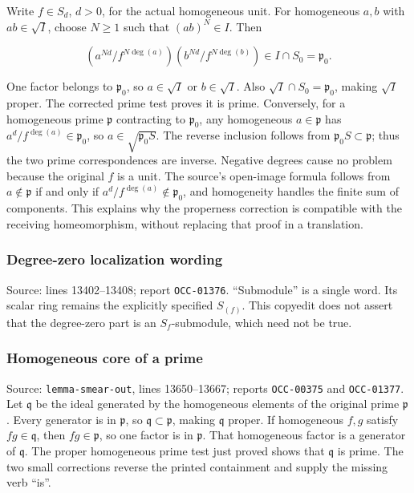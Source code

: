 Write \(f\in S_d\), \(d>0\), for the actual homogeneous unit. For homogeneous \(a,b\) with \(ab\in\sqrt I\), choose \(N\geq1\) such that \((ab)^N\in I\). Then

\[
\left(a^{Nd}/f^{N\deg(a)}\right)
\left(b^{Nd}/f^{N\deg(b)}\right)\in I\cap S_0=\mathfrak p_0.
\]

One factor belongs to \(\mathfrak p_0\), so \(a\in\sqrt I\) or \(b\in\sqrt I\). Also \(\sqrt I\cap S_0=\mathfrak p_0\), making \(\sqrt I\) proper. The corrected prime test proves it is prime. Conversely, for a homogeneous prime \(\mathfrak p\) contracting to \(\mathfrak p_0\), any homogeneous \(a\in\mathfrak p\) has \(a^d/f^{\deg(a)}\in\mathfrak p_0\), so \(a\in\sqrt{\mathfrak p_0S}\). The reverse inclusion follows from \(\mathfrak p_0S\subset\mathfrak p\); thus the two prime correspondences are inverse. Negative degrees cause no problem because the original \(f\) is a unit. The source's open-image formula follows from \(a\notin\mathfrak p\) if and only if \(a^d/f^{\deg(a)}\notin\mathfrak p_0\), and homogeneity handles the finite sum of components. This explains why the properness correction is compatible with the receiving homeomorphism, without replacing that proof in a translation.

\subsubsection{Degree-zero localization wording}\label{algebra-proof-002-degree-zero-localization-wording}

Source: lines 13402--13408; report \texttt{OCC-01376}. ``Submodule'' is a single word. Its scalar ring remains the explicitly specified \(S_{(f)}\). This copyedit does not assert that the degree-zero part is an \(S_f\)-submodule, which need not be true.

\subsubsection{Homogeneous core of a prime}\label{algebra-proof-002-homogeneous-core-of-a-prime}

Source: \texttt{lemma-smear-out}, lines 13650--13667; reports \texttt{OCC-00375} and \texttt{OCC-01377}. Let \(\mathfrak q\) be the ideal generated by the homogeneous elements of the original prime \(\mathfrak p\). Every generator is in \(\mathfrak p\), so \(\mathfrak q\subset\mathfrak p\), making \(\mathfrak q\) proper. If homogeneous \(f,g\) satisfy \(fg\in\mathfrak q\), then \(fg\in\mathfrak p\), so one factor is in \(\mathfrak p\). That homogeneous factor is a generator of \(\mathfrak q\). The proper homogeneous prime test just proved shows that \(\mathfrak q\) is prime. The two small corrections reverse the printed containment and supply the missing verb ``is''.


